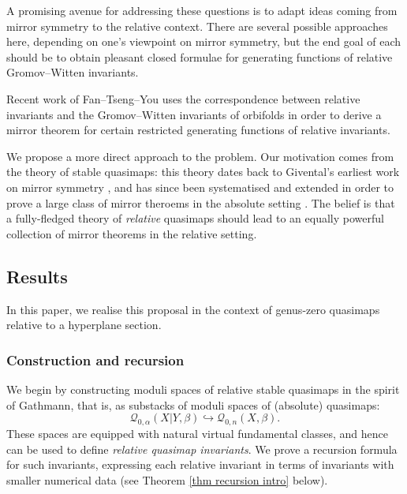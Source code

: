 \documentclass[10pt]{amsart}
\theoremstyle{definition}
\theoremstyle{definition}
\begin{document}
A promising avenue for addressing these questions is to adapt ideas coming from mirror symmetry to the relative context. There are several possible approaches here, depending on one's viewpoint on mirror symmetry, but the end goal of each should be to obtain pleasant closed formulae for generating functions of relative Gromov--Witten invariants.

Recent work of Fan--Tseng--You \cite{FanTsengYou} uses the correspondence between relative invariants and the Gromov--Witten invariants of orbifolds \cite{AbramovichCadmanWise} in order to derive a mirror theorem for certain restricted generating functions of relative invariants.

We propose a more direct approach to the problem. Our motivation comes from the theory of stable quasimaps: this theory dates back to Givental's earliest work on mirror symmetry \cite{Givental-mirror}, and has since been systematised and extended in order to prove a large class of mirror theroems in the absolute setting \cite{CF-K,CFKM, CF-K-wallcrossing,CF-K-MirrorSymmetry}. The belief is that a fully-fledged theory of \emph{relative} quasimaps should lead to an equally powerful collection of mirror theorems in the relative setting.

\subsection{Results}
In this paper, we realise this proposal in the context of genus-zero quasimaps relative to a hyperplane section.

\subsubsection{Construction and recursion} We begin by constructing moduli spaces of relative stable quasimaps in the spirit of Gathmann, that is, as substacks of moduli spaces of (absolute) quasimaps:
\begin{equation*} \mathcal{Q}_{0,\alpha}(X|Y,\beta) \hookrightarrow \mathcal{Q}_{0,n}(X,\beta).\end{equation*}
These spaces are equipped with natural virtual fundamental classes, and hence can be used to define \emph{relative quasimap invariants}. We prove a recursion formula for such invariants, expressing each relative invariant in terms of invariants with smaller numerical data (see Theorem \ref{thm recursion intro} below).
\end{document}
